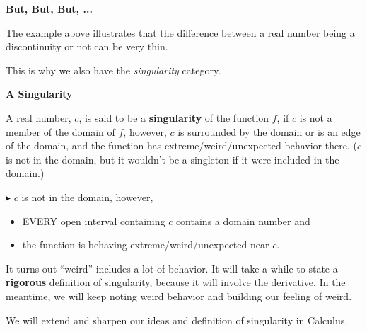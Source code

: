 \documentclass{ximera}
\begin{document}
\begin{observation} \textbf{\textcolor{-red!75}{But, But, But, ...}}  

The example above illustrates that the difference between a real number being a discontinuity or not can be very thin.

This is why we also have the \textit{singularity} category.

\end{observation}










\begin{idea} \textbf{\textcolor{blue!55!black}{A Singularity}}  

A real number, $c$, is said to be a \textbf{singularity} of the function $f$, if $c$ is not a member of the domain of $f$, however, $c$ is surrounded by the domain or is an edge of the domain, and the function has extreme/weird/unexpected behavior there. ($c$ is not in the domain, but it wouldn't be a singleton if it were included in the domain.) 



$\blacktriangleright$  $c$ is not in the domain, however, 


\begin{itemize}
\item EVERY open interval containing $c$ contains a domain number and 
\item the function is behaving extreme/weird/unexpected near $c$. 
\end{itemize}
It turns out ``weird'' includes a lot of behavior.  It will take a while to state a \textbf{\textcolor{purple!85!blue}{rigorous}} definition of singularity, because it will involve the derivative.  In the meantime, we will keep noting weird behavior and building our feeling of weird.


We will extend and sharpen our ideas and definition of singularity in Calculus.



\end{idea}
\end{document}
